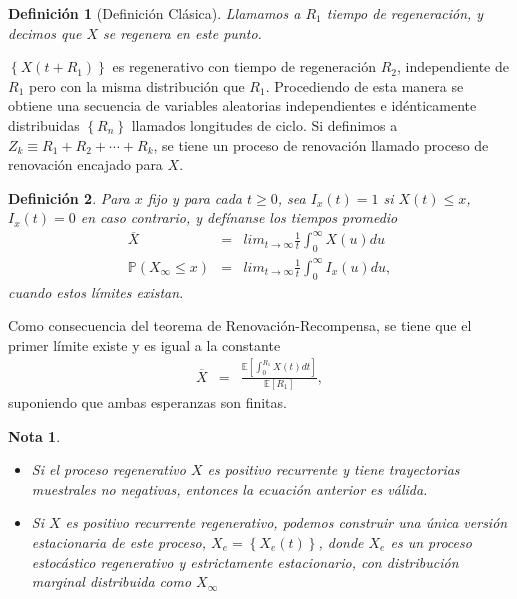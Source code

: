 \documentclass{article}
\newtheorem{Def}{Definición}[section]
\newtheorem{Note}{Nota}[section]
\newcommand{\esp}{\mathbb{E}}
\newcommand{\prob}{\mathbb{P}}
\numberwithin{equation}{section}
\begin{document}
{\begin{Def}[Definici\'on Cl\'asica]
Llamamos a $R_{1}$ tiempo de regeneraci\'on, y decimos que $X$ se regenera en este punto.
\end{Def}

$\left\{X\left(t+R_{1}\right)\right\}$ es regenerativo con tiempo de regeneraci\'on $R_{2}$, independiente de $R_{1}$ pero con la misma distribuci\'on que $R_{1}$. Procediendo de esta manera se obtiene una secuencia de variables aleatorias independientes e id\'enticamente distribuidas $\left\{R_{n}\right\}$ llamados longitudes de ciclo. Si definimos a $Z_{k}\equiv R_{1}+R_{2}+\cdots+R_{k}$, se tiene un proceso de renovaci\'on llamado proceso de renovaci\'on encajado para $X$.




\begin{Def}
Para $x$ fijo y para cada $t\geq0$, sea $I_{x}\left(t\right)=1$ si $X\left(t\right)\leq x$,  $I_{x}\left(t\right)=0$ en caso contrario, y def\'inanse los tiempos promedio
\begin{eqnarray*}
\overline{X}&=&lim_{t\rightarrow\infty}\frac{1}{t}\int_{0}^{\infty}X\left(u\right)du\\
\prob\left(X_{\infty}\leq x\right)&=&lim_{t\rightarrow\infty}\frac{1}{t}\int_{0}^{\infty}I_{x}\left(u\right)du,
\end{eqnarray*}
cuando estos l\'imites existan.
\end{Def}

Como consecuencia del teorema de Renovaci\'on-Recompensa, se tiene que el primer l\'imite  existe y es igual a la constante
\begin{eqnarray*}
\overline{X}&=&\frac{\esp\left[\int_{0}^{R_{1}}X\left(t\right)dt\right]}{\esp\left[R_{1}\right]},
\end{eqnarray*}
suponiendo que ambas esperanzas son finitas.

\begin{Note}
\begin{itemize}
\item[a)] Si el proceso regenerativo $X$ es positivo recurrente y tiene trayectorias muestrales no negativas, entonces la ecuaci\'on anterior es v\'alida.
\item[b)] Si $X$ es positivo recurrente regenerativo, podemos construir una \'unica versi\'on estacionaria de este proceso, $X_{e}=\left\{X_{e}\left(t\right)\right\}$, donde $X_{e}$ es un proceso estoc\'astico regenerativo y estrictamente estacionario, con distribuci\'on marginal distribuida como $X_{\infty}$
\end{itemize}
\end{Note}

}
\end{document}
